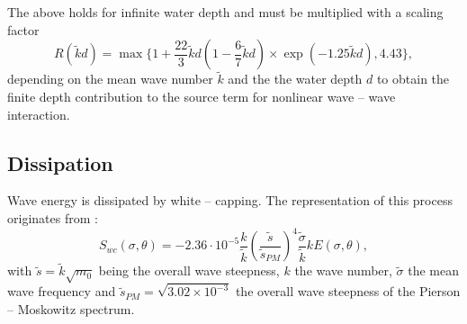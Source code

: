 The above holds for infinite water depth and must be multiplied with a scaling 
factor 
\begin{equation}
 R ( \tilde{k}d ) = \max \{ 1+ \frac{22}{3}\tilde{k}d \left( 1-\frac{6}{7} 
\tilde{k}d \right) \times \exp(-1.25 \tilde{k}d) , 4.43 \} ,
\end{equation}
depending on the mean wave number $\tilde{k}$ and the the water depth $d$ to 
obtain the finite depth contribution to the source term for nonlinear wave -- 
wave interaction.

\subsection{Dissipation}

Wave energy is dissipated by white -- capping. The representation of this 
process originates from \citep[][]{hasselmann1974}:
\begin{equation}
 S_{wc} (\sigma, \theta ) = - 2.36 \cdot 10^{-5} \frac{k}{\tilde{k}} \left( 
\frac{\tilde{s}}{\tilde{s}_{PM}} \right)^4 \frac{\tilde{\sigma}}{\tilde{k}} k 
E(\sigma, \theta),
\end{equation}
with $\tilde{s} = \tilde{k} \sqrt{m_0}$ being the overall wave steepness, $k$ 
the wave number, $\tilde{\sigma}$ the mean wave frequency and $\tilde{s}_{PM} = 
\sqrt{3.02 \times 10^{-3}}$ the overall wave steepness of the Pierson -- 
Moskowitz spectrum.